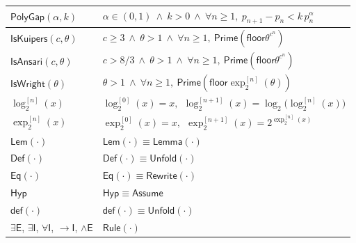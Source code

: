 \documentclass[11pt,reqno]{amsart}
\newcommand{\floor}{\mathsf{floor}}
\theoremstyle{blueplain}
\numberwithin{equation}{section}
\begin{document}
{\begin{longtable}{|p{4.2cm}|p{11.2cm}|}
	\hline
	$\mathsf{PolyGap}(\alpha,k)$ &
	$\alpha\in(0,1)\ \wedge\ k>0\ \wedge\ \forall n\ge1,\
	p_{n+1}-p_n<k\,p_n^{\alpha}$\\
	\hline
	$\mathsf{IsKuipers}(c,\theta)$ &
	$c\ge3\ \wedge\ \theta>1\ \wedge\ \forall n\ge1,\
	\mathsf{Prime}(\floor{\theta^{c^n}})$\\
	\hline
	$\mathsf{IsAnsari}(c,\theta)$ &
	$c>8/3\ \wedge\ \theta>1\ \wedge\ \forall n\ge1,\
	\mathsf{Prime}(\floor{\theta^{c^n}})$\\
	\hline
	$\mathsf{IsWright}(\theta)$ &
	$\theta>1\ \wedge\ \forall n\ge1,\
	\mathsf{Prime}(\floor{\exp_2^{[n]}(\theta)})$\\
	\hline
	$\log_2^{[n]}(x)$ &
	$\log_2^{[0]}(x)=x,\ \ \log_2^{[n+1]}(x)=\log_2\bigl(\log_2^{[n]}(x)\bigr)$\\
	\hline
	$\exp_2^{[n]}(x)$ &
	$\exp_2^{[0]}(x)=x,\ \ \exp_2^{[n+1]}(x)=2^{\exp_2^{[n]}(x)}$\\
	\hline
	$\mathsf{Lem}(\cdot)$ &
	$\mathsf{Lem}(\cdot)\equiv\mathsf{Lemma}(\cdot)$\\
	\hline
	$\mathsf{Def}(\cdot)$ &
	$\mathsf{Def}(\cdot)\equiv\mathsf{Unfold}(\cdot)$\\
	\hline
	$\mathsf{Eq}(\cdot)$ &
	$\mathsf{Eq}(\cdot)\equiv\mathsf{Rewrite}(\cdot)$\\
	\hline
	$\mathsf{Hyp}$ &
	$\mathsf{Hyp}\equiv\mathsf{Assume}$\\
	\hline
	$\mathsf{def}(\cdot)$ &
	$\mathsf{def}(\cdot)\equiv\mathsf{Unfold}(\cdot)$\\
	\hline
	$\exists\mathsf{E}$, $\exists\mathsf{I}$, $\forall\mathsf{I}$, $\rightarrow\mathsf{I}$, $\wedge\mathsf{E}$ &
	$\mathsf{Rule}(\cdot)$\\
	\hline
\end{longtable}


}
\end{document}
